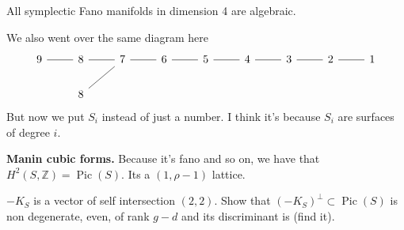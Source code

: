 \begin{coro}\leavevmode
	All symplectic Fano manifolds in dimension 4 are algebraic.
\end{coro}

We also went over the same diagram here
\[\begin{tikzcd}
				9\arrow[r,no head]&8\arrow[r,no head]&7\arrow[ld,no head]\arrow[r,no head]&6\arrow[r,no head]&5\arrow[r,no head]&4\arrow[r,no head]&3\arrow[r,no head]&2\arrow[r,no head]&1\\
				&8
			\end{tikzcd}\]
But now we put $S_i$ instead of just a number. I think it's because  $S_i$ are surfaces of degree $i$.

{\color{3}\bfseries Manin cubic forms.}\hspace{.5em} Because it's fano and so on, we have that $H^{2}(S,\mathbb{Z})=\operatorname{Pic}(S)$. Its a $(1,\rho-1)$ lattice. 

\begin{exercise}\leavevmode
	$-K_S$ is a vector of self intersection  $(2,2)$. Show that $(-K_S)^\perp \subset \operatorname{Pic}(S)$ is non degenerate, even, of rank $g-d$ and its discriminant is (find it).
\end{exercise}


